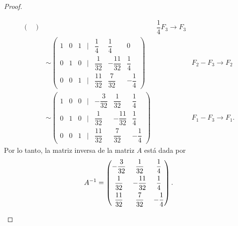 \documentclass[11pt]{article}
\begin{document}
\begin{proof}
\begin{enumerate}[leftmargin=*,label=\textit{\alph*})]
\begin{align*}
\begin{pmatrix}
        \end{pmatrix} && \dfrac{1}{4}F_3 \rightarrow F_3 \\[0.75em]
            & \sim \begin{pmatrix}
            1 & 0 & 1 & | & \dfrac{1}{4} & \dfrac{1}{4} & 0\\[0.75em]
            0 & 1 & 0 & | & \dfrac{1}{32} & -\dfrac{11}{32} & \dfrac{1}{4}\\[0.75em]
            0 & 0 & 1 & | & \dfrac{11}{32} & \dfrac{7}{32} & -\dfrac{1}{4}
        \end{pmatrix} && F_2-F_3 \rightarrow F_2 \\[0.75em]
            & \sim \begin{pmatrix}
            1 & 0 & 0 & | & -\dfrac{3}{32} & \dfrac{1}{32} & \dfrac{1}{4}\\[0.75em]
            0 & 1 & 0 & | & \dfrac{1}{32} & -\dfrac{11}{32} & \dfrac{1}{4}\\[0.75em]
            0 & 0 & 1 & | & \dfrac{11}{32} & \dfrac{7}{32} & -\dfrac{1}{4}
        \end{pmatrix} && F_1-F_3 \rightarrow F_1.
        \end{align*}
    Por lo tanto, la matriz inversa de la matriz $A$ está dada por
    \[
        A^{-1} = \begin{pmatrix}
             -\dfrac{3}{32} & \dfrac{1}{32} & \dfrac{1}{4}\\[0.75em]
             \dfrac{1}{32} & -\dfrac{11}{32} & \dfrac{1}{4}\\[0.75em]
             \dfrac{11}{32} & \dfrac{7}{32} & -\dfrac{1}{4}
        \end{pmatrix}. \qedhere
    \]
\end{enumerate}
\end{proof}    
\end{document}
